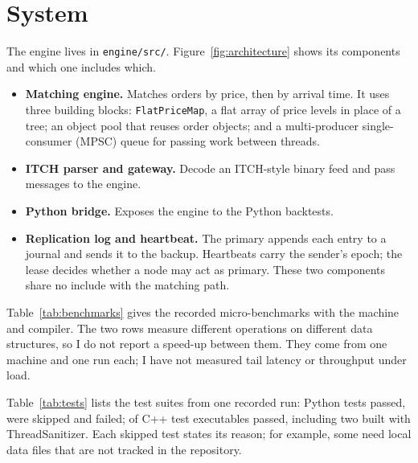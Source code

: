 \section{System}\label{sec:system}
The engine lives in \texttt{engine/src/}. Figure~\ref{fig:architecture} shows its components and which one includes which.

\begin{itemize}
\item \textbf{Matching engine.} Matches orders by price, then by arrival time. It uses three building blocks: \texttt{FlatPriceMap}, a flat array of price levels in place of a tree; an object pool that reuses order objects; and a multi-producer single-consumer (MPSC) queue for passing work between threads.
\item \textbf{ITCH parser and gateway.} Decode an ITCH-style binary feed and pass messages to the engine.
\item \textbf{Python bridge.} Exposes the engine to the Python backtests.
\item \textbf{Replication log and heartbeat.} The primary appends each entry to a journal and sends it to the backup. Heartbeats carry the sender's epoch; the lease decides whether a node may act as primary. These two components share no include with the matching path.
\end{itemize}



Table~\ref{tab:benchmarks} gives the recorded micro-benchmarks with the machine and compiler. The two rows measure different operations on different data structures, so I do not report a speed-up between them. They come from one machine and one run each; I have not measured tail latency or throughput under load.



Table~\ref{tab:tests} lists the test suites from one recorded run: \TestsPyPassed{} Python tests passed, \TestsPySkipped{} were skipped and \TestsPyFailed{} failed; \TestsCppPassed{} of \TestsCppTotal{} C++ test executables passed, including two built with ThreadSanitizer. Each skipped test states its reason; for example, some need local data files that are not tracked in the repository.


